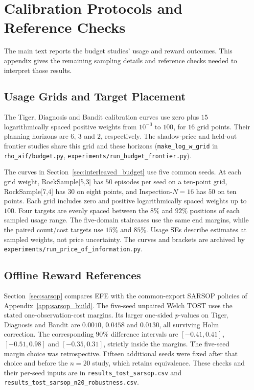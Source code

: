 \documentclass[runningheads]{llncs}
\begin{document}
\FloatBarrier
\section{Calibration Protocols and Reference Checks}
\label{app:extended_budget_evidence}

The main text reports the budget studies' usage and reward outcomes. This appendix gives the remaining sampling details and reference checks needed to interpret those results.

\subsection{Usage Grids and Target Placement}
\label{app:interleaved_details}

The Tiger, Diagnosis and Bandit calibration curves use zero plus $15$ logarithmically spaced positive weights from $10^{-3}$ to $100$, for $16$ grid points. Their planning horizons are $6$, $3$ and $2$, respectively. The shadow-price and held-out frontier studies share this grid and these horizons (\texttt{make\_\allowbreak log\_\allowbreak w\_\allowbreak grid} in \texttt{rho\_\allowbreak aif/\allowbreak budget.py}, \texttt{experiments/\allowbreak run\_\allowbreak budget\_\allowbreak frontier.py}).

The curves in Section~\ref{sec:interleaved_budget} use five common seeds. At each grid weight, RockSample[5,3] has $50$ episodes per seed on a ten-point grid, RockSample[7,4] has $30$ on eight points, and Inspection-$N=16$ has $50$ on ten points. Each grid includes zero and positive logarithmically spaced weights up to $100$. Four targets are evenly spaced between the $8\%$ and $92\%$ positions of each sampled usage range. The five-domain staircases use the same end margins, while the paired count/cost targets use $15\%$ and $85\%$. Usage SEs describe estimates at sampled weights, not price uncertainty. The curves and brackets are archived by \texttt{experiments/\allowbreak run\_\allowbreak price\_\allowbreak of\_\allowbreak information.py}.

\subsection{Offline Reward References}
\label{app:sarsop_details}
\label{app:cpomdp_details}

Section~\ref{sec:sarsop} compares EFE with the common-export SARSOP policies of Appendix~\ref{app:sarsop_build}. The five-seed unpaired Welch TOST uses the stated one-observation-cost margins. Its larger one-sided $p$-values on Tiger, Diagnosis and Bandit are $0.0010$, $0.0458$ and $0.0130$, all surviving Holm correction. The corresponding $90\%$ difference intervals are $[-0.41,0.41]$, $[-0.51,0.98]$ and $[-0.35,0.31]$, strictly inside the margins. The five-seed margin choice was retrospective. Fifteen additional seeds were fixed after that choice and before the $n=20$ study, which retains equivalence. These checks and their per-seed inputs are in \texttt{results\_\allowbreak tost\_\allowbreak sarsop.csv} and \texttt{results\_\allowbreak tost\_\allowbreak sarsop\_\allowbreak n20\_\allowbreak robustness.csv}.
\end{document}
